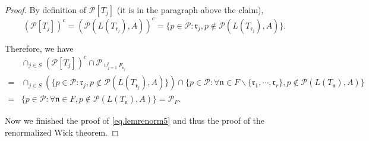 \begin{proof}
By definition of $\mathcal{P}[T_j]$ (it is in the paragraph above the claim), 
\begin{equation}
    (\mathcal{P}[T_j])^c = (\mathcal{P}(L(T_{\mathfrak{r}_j}),A))^c = \{p\in\mathcal{P}:\mathfrak{r}_j,p\notin \mathcal{P}(L(T_{\mathfrak{r}_j}),A)\}.
\end{equation}

Therefore, we have
\begin{equation}
    \begin{split}
        &\cap_{j\in S}(\mathcal{P}[T_j])^c\cap \mathcal{P}_{\cup_{j=1}^r F_{\mathfrak{r}_{j}}}
        \\
        =&\cap_{j\in S} (\{p\in\mathcal{P}:\mathfrak{r}_j,p\notin \mathcal{P}(L(T_{\mathfrak{r}_j}),A)\}) \cap \{p\in\mathcal{P}:\forall \mathfrak{n}\in F\backslash \{\mathfrak{r}_1,\cdots,\mathfrak{r}_r\},p\notin \mathcal{P}(L(T_{\mathfrak{n}}),A)\}
        \\
        = & \{p\in\mathcal{P}:\forall \mathfrak{n}\in F,p\notin \mathcal{P}(L(T_{\mathfrak{n}}),A)\} = \mathcal{P}_F.
    \end{split}
\end{equation}






Now we finished the proof of \eqref{eq.lemrenorm5} and thus the proof of the renormalized Wick theorem.
\end{proof}


